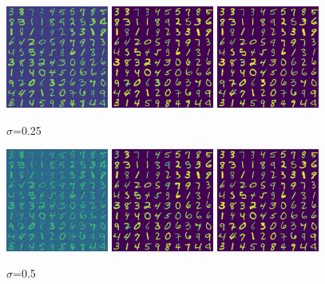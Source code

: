 \documentclass[english]{exercisesheet}
\begin{document}
\begin{solution}
\begin{figure}
 \includegraphics[width=0.3\textwidth]{images/noisy-25.pdf}
 \includegraphics[width=0.3\textwidth]{images/denoised-25-mean.pdf}
 \includegraphics[width=0.3\textwidth]{images/denoised-25-map.pdf}
 \caption{$\sigma$=0.25}
 \label{s25}
\end{figure}

\begin{figure}
 \includegraphics[width=0.3\textwidth]{images/noisy-50.pdf}
 \includegraphics[width=0.3\textwidth]{images/denoised-50-mean.pdf}
 \includegraphics[width=0.3\textwidth]{images/denoised-50-map.pdf}
 \caption{$\sigma$=0.5}
 \label{s5}
\end{figure}


\end{solution}
\end{document}
